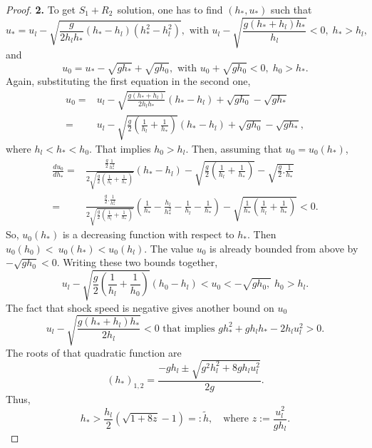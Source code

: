 \documentclass[10pt,a4paper]{amsart}
\begin{document}
\begin{proof}
\noindent \textbf{2.}
To get \(S_{1} + R_{2}\ \ \)solution, one has to find
\((h_{\ast},u_{\ast})\) such that
\[ 
u_{\ast} = u_{l} - \sqrt{\frac{g}{2h_{l}h_{\ast}}\left( h_{\ast} - h_{l} \right)
\left( h_{\ast}^{2} - h_{l}^{2} \right)}, \text{ with }
u_{l} - \sqrt{\frac{g\left( h_{\ast} + h_{l} \right)h_{\ast}}{h_{l}}}<0, \; 
h_{\ast} > h_{l},
\]
and 
\[
u_{0} = u_{\ast} - \sqrt{gh_{\ast}} + \sqrt{gh_{0}}, \text{ with } 
u_{0} + \sqrt{gh_{0}} < 0, \; h_{0} > h_{\ast}.
\]
Again, substituting the first equation in the second one,
\[
\begin{split}
u_{0} = & u_{l} - \sqrt{\frac{g\left( h_{\ast} + h_{l} \right)}{{2h}_{l}h_{\ast}}}\left( h_{\ast} 
- h_{l} \right) + \sqrt{gh_{0}} - \sqrt{gh_{\ast}}\\
= & u_{l} - \sqrt{\frac{g}{2}\left( \frac{1}{h_{l}} + \frac{1}{h_{\ast}} \right)}\left( h_{\ast} 
- h_{l} \right) + \sqrt{gh_{0}} - \sqrt{gh_{\ast}},
\end{split}
\]
where \(h_{l} < h_{\ast} <  h_{0} \). That implies \(h_{0} > h_{l}\). Then, 
assuming that $u_{0}=u_{0}(h_{\ast})$, 
\[
\begin{split}
\frac{{du}_{0}}{{dh}_{\ast}} = & \frac{\frac{g}{2} \frac{1}{h_{\ast}^{2}}}{2\sqrt{\frac{g}{2}
\left( \frac{1}{h_{l}} + \frac{1}{h_{\ast}} \right)}}\left( h_{\ast} - h_{l} \right) 
- \sqrt{\frac{g}{2}\left( \frac{1}{h_{l}} + \frac{1}{h_{\ast}} \right)} 
- \sqrt{\frac{g}{2}.\frac{1}{h_{\ast}}} \\ 
= & \frac{\frac{g}{2}.\frac{1}{h_{\ast}^{2}}}{2\sqrt{\frac{g}{2}
\left( \frac{1}{h_{l}} + \frac{1}{h_{\ast}} \right)}}\left( \frac{1}{h_{\ast}} 
- \frac{h_{l}}{h_{\ast}^{2}} - \frac{1}{h_{l}} - \frac{1}{h_{\ast}} \right) 
- \sqrt{\frac{1}{h_{\ast}}\left( \frac{1}{h_{l}} + \frac{1}{h_{\ast}} \right)} < 0.
\end{split}
\]
So, \(u_{0}\left( h_{\ast} \right)\) is a decreasing function with respect to
\(h_{\ast}\). Then
\(u_{0}(h_{0}) < \ u_{0}(h_{\ast}) 
< u_{0}(h_{l}).\)
The value $u_{0}$ is already bounded from above by $-\sqrt{gh_{0}}<0$.
Writing these two bounds together,
\begin{equation*} 
u_{l} - \sqrt{\frac{g}{2}\left( \frac{1}{h_{l}} + \frac{1}{h_{0}} \right)}
\left( h_{0} - h_{l} \right) < u_{0} 
< -\sqrt{gh_{0},}\;  h_{0} > h_{l}.
\end{equation*}
The fact that shock speed is negative gives another bound on 
\({u}_{0}\)
\[
u_{l} - \sqrt{\frac{g\left( h_{\ast} + h_{l} \right)h_{\ast}}{2h_{l}}}<0 
\text{ that implies }  gh_{\ast}^{2} + gh_{l}h_{\ast} - 2h_{l}u_{l}^{2} > 0.
\]
The roots of that quadratic function are
\[
(h_{\ast})_{1,2} = \frac{- gh_{l} \pm \sqrt{g^{2}h_{l}^{2} + 8gh_{l}u_{l}^{2}}}{2g}.
\]
Thus, 
\[
h_{\ast} > \frac{h_l}{2}\left( \sqrt{1+8z} - 1\right) =: \tilde{h}, \quad \text{where } z:= \frac{u_l^2}{gh_l}.
\]


\end{proof}
\end{document}

